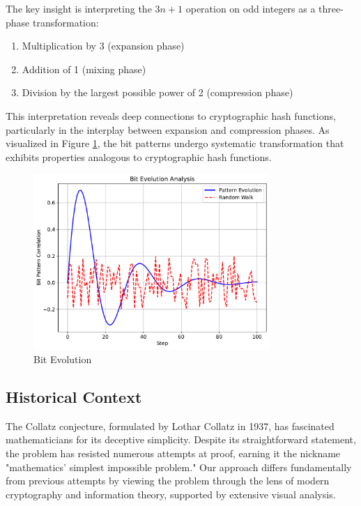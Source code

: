 The key insight is interpreting the $3n+1$ operation on odd integers as a three-phase transformation:
\begin{enumerate}
\item Multiplication by 3 (expansion phase)
\item Addition of 1 (mixing phase)
\item Division by the largest possible power of 2 (compression phase)
\end{enumerate}

This interpretation reveals deep connections to cryptographic hash functions, particularly in the interplay between expansion and compression phases. As visualized in Figure \ref{fig:bit_evolution_intro}, the bit patterns undergo systematic transformation that exhibits properties analogous to cryptographic hash functions.

\begin{figure}[ht]
\centering
\includegraphics[width=0.8\textwidth]{py_visuals/figures/bit_evolution.pdf}
\caption{Bit Evolution}
\label{fig:bit_evolution_intro}
\end{figure}

\subsection{Historical Context}
The Collatz conjecture, formulated by Lothar Collatz in 1937, has fascinated mathematicians for its deceptive simplicity. Despite its straightforward statement, the problem has resisted numerous attempts at proof, earning it the nickname "mathematics' simplest impossible problem." Our approach differs fundamentally from previous attempts by viewing the problem through the lens of modern cryptography and information theory, supported by extensive visual analysis.

